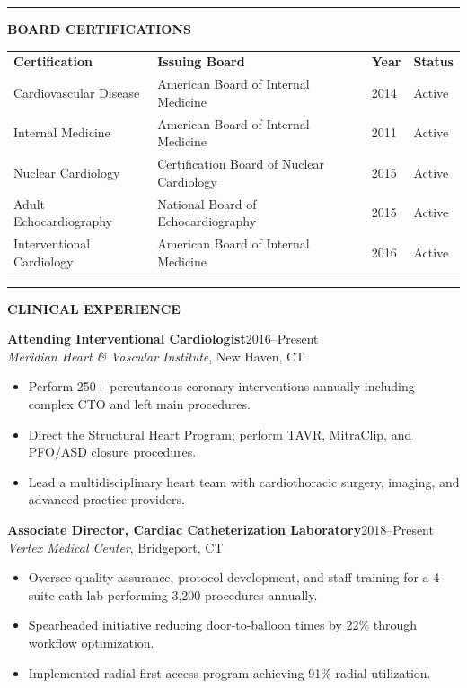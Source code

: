 \documentclass[11pt,a4paper]{article}
\newcommand{\cvsection}[1]{%
  \vspace{1.2em}%
  \noindent
  {\color{primary}\rule{3.5pt}{15pt}}\hspace{8pt}%
  {\color{primary}\Large\bfseries\MakeUppercase{#1}}%
  \vspace{0.2em}%
  \par\noindent{\color{primary!25}\rule{\textwidth}{0.5pt}}%
  \vspace{0.6em}%
}
\begin{document}
\cvsection{Board Certifications}

\vspace{-4pt}
\noindent
\begin{tabular}{p{4cm} p{3.8cm} p{1.8cm} p{2cm}}
\rowcolor{lightbg}
\textbf{\color{primary}Certification} & \textbf{\color{primary}Issuing Board} & \textbf{\color{primary}Year} & \textbf{\color{primary}Status} \\{}
Cardiovascular Disease & American Board of Internal Medicine & 2014 & Active \\{}
Internal Medicine & American Board of Internal Medicine & 2011 & Active \\{}
Nuclear Cardiology & Certification Board of Nuclear Cardiology & 2015 & Active \\{}
Adult Echocardiography & National Board of Echocardiography & 2015 & Active \\{}
Interventional Cardiology & American Board of Internal Medicine & 2016 & Active
\end{tabular}

\cvsection{Clinical Experience}

\vspace{-2pt}
\noindent\textbf{\color{primary}Attending Interventional Cardiologist}\hfill 2016--Present\\
\textit{Meridian Heart \& Vascular Institute}, New Haven, CT
\begin{itemize}[leftmargin=*, nosep, itemsep=0pt, before={\color{darktext}}]
  \item Perform 250+ percutaneous coronary interventions annually including complex CTO and left main procedures.
  \item Direct the Structural Heart Program; perform TAVR, MitraClip, and PFO/ASD closure procedures.
  \item Lead a multidisciplinary heart team with cardiothoracic surgery, imaging, and advanced practice providers.
\end{itemize}

\vspace{6pt}
\noindent\textbf{\color{primary}Associate Director, Cardiac Catheterization Laboratory}\hfill 2018--Present\\
\textit{Vertex Medical Center}, Bridgeport, CT
\begin{itemize}[leftmargin=*, nosep, itemsep=0pt, before={\color{darktext}}]
  \item Oversee quality assurance, protocol development, and staff training for a 4-suite cath lab performing 3,200 procedures annually.
  \item Spearheaded initiative reducing door-to-balloon times by 22\% through workflow optimization.
  \item Implemented radial-first access program achieving 91\% radial utilization.
\end{itemize}
\end{document}
